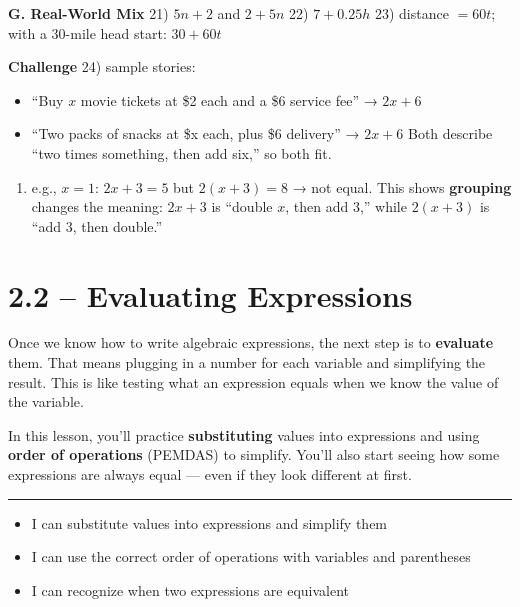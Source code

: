 \documentclass[
  letterpaper,
  DIV=11,
  numbers=noendperiod]{scrreprt}
\providecommand{\tightlist}{%
  \setlength{\itemsep}{0pt}\setlength{\parskip}{0pt}}
\begin{document}
\textbf{G. Real-World Mix} 21) \(5n+2\) and \(2+5n\) 22) \(7+0.25h\) 23)
distance \(= 60t\); with a 30-mile head start: \(30+60t\)

\textbf{Challenge} 24) sample stories:

\begin{itemize}
\tightlist
\item
  ``Buy \(x\) movie tickets at \$2 each and a \$6 service fee'' →
  \(2x+6\)
\item
  ``Two packs of snacks at \$x each, plus \$6 delivery'' → \(2x+6\) Both
  describe ``two times something, then add six,'' so both fit.
\end{itemize}

\begin{enumerate}
\def\labelenumi{\arabic{enumi}.}
\setcounter{enumi}{24}
\tightlist
\item
  e.g., \(x=1\): \(2x+3=5\) but \(2(x+3)=8\) → not equal. This shows
  \textbf{grouping} changes the meaning: \(2x+3\) is ``double \(x\),
  then add 3,'' while \(2(x+3)\) is ``add 3, then double.''
\end{enumerate}

\chapter*{2.2 -- Evaluating Expressions}\label{evaluating-expressions}


Once we know how to write algebraic expressions, the next step is to
\textbf{evaluate} them. That means plugging in a number for each
variable and simplifying the result. This is like testing what an
expression equals when we know the value of the variable.

In this lesson, you'll practice \textbf{substituting} values into
expressions and using \textbf{order of operations} (PEMDAS) to simplify.
You'll also start seeing how some expressions are always equal --- even
if they look different at first.

\begin{center}\rule{0.5\linewidth}{0.5pt}\end{center}

\begin{itemize}
\tightlist
\item
  I can substitute values into expressions and simplify them\\
\item
  I can use the correct order of operations with variables and
  parentheses\\
\item
  I can recognize when two expressions are equivalent\\
\end{itemize}
\end{document}
